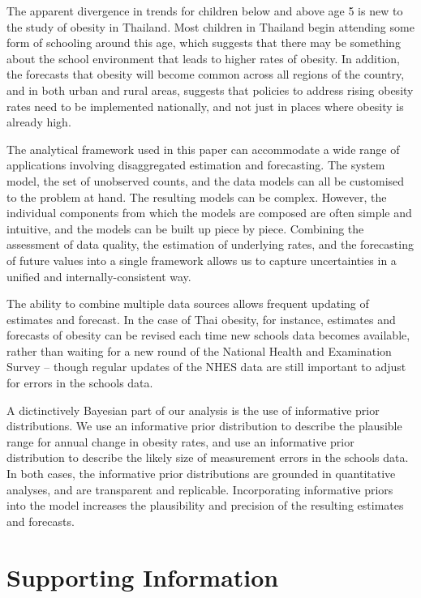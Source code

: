 \documentclass[10pt,letterpaper]{article}
\begin{document}
The apparent divergence in trends for children below and above age 5 is
new to the study of obesity in Thailand. Most children in Thailand begin
attending some form of schooling around this age, which suggests that
there may be something about the school environment that leads to higher
rates of obesity. In addition, the forecasts that obesity will become
common across all regions of the country, and in both urban and rural
areas, suggests that policies to address rising obesity rates need to be
implemented nationally, and not just in places where obesity is already
high.

The analytical framework used in this paper can accommodate a wide range
of applications involving disaggregated estimation and forecasting. The
system model, the set of unobserved counts, and the data models can all
be customised to the problem at hand. The resulting models can be
complex. However, the individual components from which the models are
composed are often simple and intuitive, and the models can be built up
piece by piece. Combining the assessment of data quality, the estimation
of underlying rates, and the forecasting of future values into a single
framework allows us to capture uncertainties in a unified and
internally-consistent way.

The ability to combine multiple data sources allows frequent updating of
estimates and forecast. In the case of Thai obesity, for instance,
estimates and forecasts of obesity can be revised each time new schools
data becomes available, rather than waiting for a new round of the
National Health and Examination Survey -- though regular updates of the
NHES data are still important to adjust for errors in the schools data.

A dictinctively Bayesian part of our analysis is the use of informative
prior distributions. We use an informative prior distribution to
describe the plausible range for annual change in obesity rates, and use
an informative prior distribution to describe the likely size of
measurement errors in the schools data. In both cases, the informative
prior distributions are grounded in quantitative analyses, and are
transparent and replicable. Incorporating informative priors into the
model increases the plausibility and precision of the resulting
estimates and forecasts.

\hypertarget{supporting-information}{%
\section{Supporting Information}\label{supporting-information}}
\end{document}
